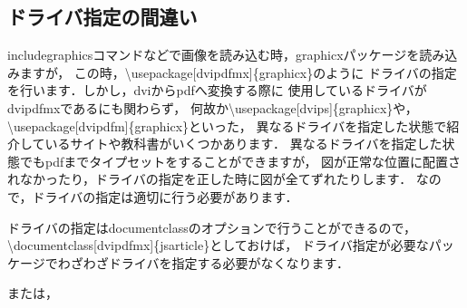 \documentclass[dvipdfmx,uplatex]{jsarticle}
\begin{document}
\subsection{ドライバ指定の間違い}
includegraphicsコマンドなどで画像を読み込む時，graphicxパッケージを読み込みますが，
この時，\textbackslash usepackage[dvipdfmx]\{graphicx\}のように
ドライバの指定を行います．しかし，dviからpdfへ変換する際に
使用しているドライバがdvipdfmxであるにも関わらず，
何故か\textbackslash usepackage[dvips]\{graphicx\}や，
\textbackslash usepackage[dvipdfm]\{graphicx\}といった，
異なるドライバを指定した状態で紹介しているサイトや教科書がいくつかあります．
異なるドライバを指定した状態でもpdfまでタイプセットをすることができますが，
図が正常な位置に配置されなかったり，ドライバの指定を正した時に図が全てずれたりします．
なので，ドライバの指定は適切に行う必要があります．

ドライバの指定はdocumentclassのオプションで行うことができるので，
\textbackslash documentclass[dvipdfmx]\{jsarticle\}としておけば，
ドライバ指定が必要なパッケージでわざわざドライバを指定する必要がなくなります．
\begin{tcolorbox}[title=ドライバの指定]
  \begin{tcolorbox}[title=dvipdfmx, colframe=wrongcolor]
  \end{tcolorbox}
  \begin{tcolorbox}[title=dvips dvipdfm, colframe=correctcolor]
    または，
  \end{tcolorbox}
\end{tcolorbox}
\end{document}
